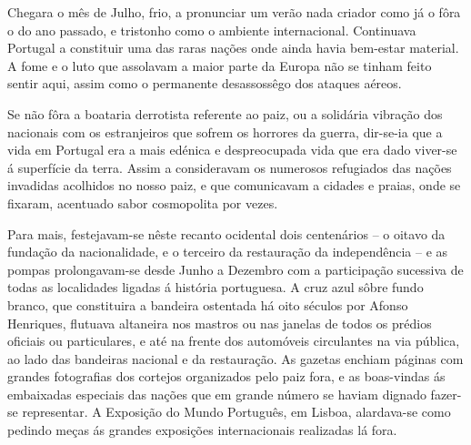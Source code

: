 \documentclass[9pt]{article}
\begin{document}
Chegara o mês de Ju\-lho, frio, a pronunciar um verão nada criador como
já o fôra o do ano passado, e tristonho como o ambiente interna\-cio\-nal. Continuava Portugal a constituir uma das raras na\-ções onde ainda havia bem-estar material. A fome e o luto que assolavam a maior parte da Europa
não se tinham feito sentir aqui, assim como o permanente desassossêgo dos
ataques aéreos.

Se não fôra a boataria derrotista referente ao paiz, ou a solidária
vibra\-ção dos nacionais com os estranjeiros que sofrem os horrores da
guerra, dir-se-ia que a vida em Portugal era a mais edénica e despreocupada vida que era dado viver-se á superfície da terra. Assim
a consideravam os numerosos refugiados das na\-ções invadidas aco\-lhidos no
nosso paiz, e que comunicavam a cidades e praias, onde se fixaram, acentuado sabor cosmopolita por vezes.

Para mais, festejavam-se nês\-te recanto ocidental dois centenários
-- o oitavo da funda\-ção da na\-cio\-nalidade, e o terceiro da restaura\-ção da
independên\-cia -- e as pompas prolongavam-se desde Junho a Dezembro com
a participa\-ção sucessiva de todas as localidades ligadas á his\-tó\-ria portuguesa. A cruz azul sôbre fundo branco, que constituira a bandeira
ostentada há oito séculos por Afonso Henriques, flutuava altaneira
 nos mastros ou nas janelas de todos os prédios oficiais ou particulares,
 e até na frente dos automóveis circulantes na via pública, ao lado das bandeiras
na\-cio\-nal e da restaura\-ção. As gazetas enchiam páginas com gran\-des fotografias dos cortejos organizados pelo paiz fora, e as boas\--vindas ás
embaixadas especiais das na\-ções que em gran\-de número se haviam dignado
fazer-se representar. A Exposi\-ção do Mundo Por\-tu\-guês, em Lisboa, alardava-se como pedindo meças ás gran\-des exposi\-ções internacionais realizadas lá fora.
\end{document}
